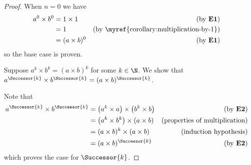\begin{questions}
\begin{proof}
        When $n = 0$ we have
        \begin{align*}
            a^0 \times b^0 &= 1 \times 1 & (\text{by \textbf{E1}})\\
            &= 1 & (\text{by \myref{corollary:multiplication-by-1}})\\
            &= (a\times b)^0 & (\text{by \textbf{E1}})
        \end{align*}
        so the base case is proven.

        Suppose $a^k \times b^k = (a\times b)^k$ for some $k \in \N$. We show that $a^\Successor{k} \times b^\Successor{k} = (a\times b)^\Successor{k}$.

        Note that
        \begin{align*}
            a^\Successor{k} \times b^\Successor{k} &= \left(a^k \times a\right) \times \left(b^k \times b\right) & (\text{by \textbf{E2}})\\
            &= \left(a^k \times b^k\right) \times (a \times b) & (\text{properties of multiplication})\\
            &= (a\times b)^k \times (a \times b) & (\text{induction hypothesis})\\
            &= (a\times b)^\Successor{k} & (\text{by \textbf{E2}})
        \end{align*}
        which proves the case for $\Successor{k}$.
    \end{proof}
\end{questions}
